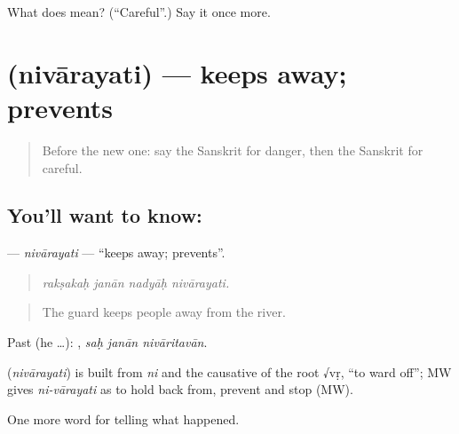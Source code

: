 \begin{tcolorbox}[breakable,colback=teal!4,colframe=teal!35!black,title={Before you move on}]
What does  mean? (\textquotedblleft{}Careful\textquotedblright{}.) Say it once more.
\end{tcolorbox}
\section[\texorpdfstring{\sk{निवारयति} (nivārayati)}{निवारयति (nivārayati)}]{ (nivārayati) — keeps away; prevents}

\label{lesson:SA-C299-nivarayati}



\begin{quote}
Before the new one: say the Sanskrit for danger, then the Sanskrit for careful.
\end{quote}

\subsection*{You'll want to know: }
\textbf{} — \emph{nivārayati} — \textquotedblleft{}keeps away; prevents\textquotedblright{}.

\begin{quote}
   
\end{quote}

\begin{quote}
\emph{rakṣakaḥ janān nadyāḥ nivārayati.}
\end{quote}

\begin{quote}
The guard keeps people away from the river.
\end{quote}

Past (he …):   , \emph{saḥ janān nivāritavān}.

\begin{cousinweb}
\textbf{} (\emph{nivārayati}) is built from \emph{ni} and the causative of the root √vṛ, \textquotedblleft{}to ward off\textquotedblright{}; MW gives \emph{ni-vārayati} as to hold back from, prevent and stop (MW).
\end{cousinweb}

\begin{grammarlens}[title={What you've built}]
One more word for telling what happened.
\end{grammarlens}

